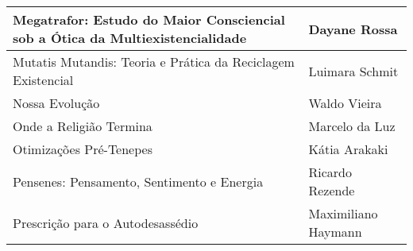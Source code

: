 \documentclass{gescons}
\begin{document}
\begin{longtable}[]{@{}
  >{\raggedright\arraybackslash}p{}
  >{\raggedright\arraybackslash}p{}@{}}
\hline
\begin{minipage}[b]{\linewidth}\raggedright
Megatrafor: Estudo do Maior Consciencial sob a Ótica da Multiexistencialidade
\end{minipage} & \begin{minipage}[b]{\linewidth}\raggedright
Dayane Rossa
\end{minipage} \\
\hline
\begin{minipage}[b]{\linewidth}\raggedright
Mutatis Mutandis: Teoria e Prática da Reciclagem Existencial
\end{minipage} & \begin{minipage}[b]{\linewidth}\raggedright
Luimara Schmit
\end{minipage} \\
\hline
\begin{minipage}[b]{\linewidth}\raggedright
Nossa Evolução
\end{minipage} & \begin{minipage}[b]{\linewidth}\raggedright
Waldo Vieira
\end{minipage} \\
\hline
\begin{minipage}[b]{\linewidth}\raggedright
Onde a Religião Termina
\end{minipage} & \begin{minipage}[b]{\linewidth}\raggedright
Marcelo da Luz
\end{minipage} \\
\hline
\begin{minipage}[b]{\linewidth}\raggedright
Otimizações Pré-Tenepes
\end{minipage} & \begin{minipage}[b]{\linewidth}\raggedright
Kátia Arakaki
\end{minipage} \\
\hline
\begin{minipage}[b]{\linewidth}\raggedright
Pensenes: Pensamento, Sentimento e Energia
\end{minipage} & \begin{minipage}[b]{\linewidth}\raggedright
Ricardo Rezende
\end{minipage} \\
\hline
\begin{minipage}[b]{\linewidth}\raggedright
Prescrição para o Autodesassédio
\end{minipage} & \begin{minipage}[b]{\linewidth}\raggedright
Maximiliano Haymann
\end{minipage} \\

\end{longtable}
\end{document}
